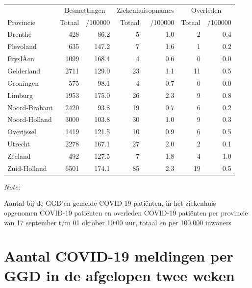 \documentclass[
  english,
  man,floatsintext]{apa6}
\begin{document}
\begin{table}
\centering
\begin{threeparttable}
\begin{tabular}{lrrrrrr}
\toprule
\multicolumn{1}{c}{ } & \multicolumn{2}{c}{Besmettingen} & \multicolumn{2}{c}{Ziekenhuisopnames} & \multicolumn{2}{c}{Overleden} \\
\cmidrule(l{3pt}r{3pt}){2-3} \cmidrule(l{3pt}r{3pt}){4-5} \cmidrule(l{3pt}r{3pt}){6-7}
Provincie & Totaal & /100000 & Totaal & /100000 & Totaal & /100000\\
\midrule
Drenthe & 428 & 86.2 & 5 & 1.0 & 2 & 0.4\\
Flevoland & 635 & 147.2 & 7 & 1.6 & 1 & 0.2\\
FryslÃ¢n & 1099 & 168.4 & 4 & 0.6 & 0 & 0.0\\
Gelderland & 2711 & 129.0 & 23 & 1.1 & 11 & 0.5\\
Groningen & 575 & 98.1 & 4 & 0.7 & 0 & 0.0\\
Limburg & 1953 & 175.0 & 26 & 2.3 & 9 & 0.8\\
Noord-Brabant & 2420 & 93.8 & 19 & 0.7 & 6 & 0.2\\
Noord-Holland & 3000 & 103.8 & 30 & 1.0 & 9 & 0.3\\
Overijssel & 1419 & 121.5 & 10 & 0.9 & 6 & 0.5\\
Utrecht & 2278 & 167.1 & 27 & 2.0 & 2 & 0.1\\
Zeeland & 492 & 127.5 & 7 & 1.8 & 4 & 1.0\\
Zuid-Holland & 6501 & 174.1 & 85 & 2.3 & 19 & 0.5\\
\bottomrule
\end{tabular}
\begin{tablenotes}
\item \textit{Note: } 
\item Aantal bij de GGD’en gemelde COVID-19 patiënten, in het ziekenhuis opgenomen COVID-19 patiënten en overleden COVID-19 patiënten per provincie van 17 september t/m 01 oktober 10:00 uur, totaal en per 100.000 inwoners
\end{tablenotes}
\end{threeparttable}
\end{table}

\newpage

\hypertarget{aantal-covid-19-meldingen-per-ggd-in-de-afgelopen-twee-weken}{%
\section{Aantal COVID-19 meldingen per GGD in de afgelopen twee weken}\label{aantal-covid-19-meldingen-per-ggd-in-de-afgelopen-twee-weken}}
\end{document}
